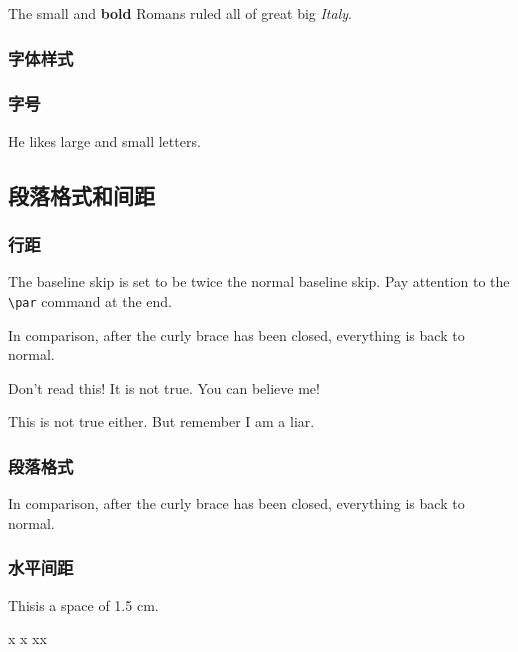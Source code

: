 \documentclass[12pt,UTF8]{ctexart}%
\begin{document}
{\small The small and
\textbf{bold} Romans ruled}
{\Large all of great big
{\itshape Italy}.}

\subsubsection{字体样式}

\subsubsection{字号}

He likes {\LARGE large and
{\small small} letters}.

\subsection{段落格式和间距}

\subsubsection{行距}

{\linespread{2.0}\selectfont
The baseline skip is set to be
twice the normal baseline skip.
Pay attention to the \verb|\par|
command at the end. \par}
In comparison, after the
curly brace has been closed,
everything is back to normal.

{\Large Don't read this!
It is not true.
You can believe me!\par}

{\Large This is not true either.
But remember I am a liar.}\par


\subsubsection{段落格式}

\setlength{\parskip}{1ex plus 0.5ex minus 0.2ex}

In comparison, after the
curly brace has been closed,
everything is back to normal.


\subsubsection{水平间距}

This\hspace{1.5cm}is a space
of 1.5 cm.

x
x
x\hspace{\fill}x
\end{document}
